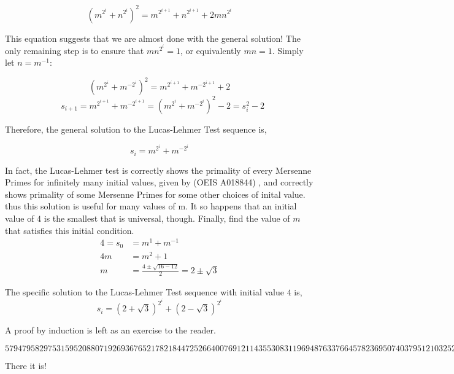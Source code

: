 \documentclass[10pt, oneside]{article}
\begin{document}
    \[\left(m^{2^i} + n^{2^i}\right)^2 = m^{2^{i+1}} + n^{2^{i+1}} + 2mn^{2^i}\]
    
This equation suggests that we are almost done with the general solution! The only remaining step is to ensure that $mn^{2^i} = 1$, or equivalently $mn = 1$. Simply let $n = m^{-1}$:

    \[\left(m^{2^i} + m^{-2^i}\right)^2 = m^{2^{i+1}} + m^{-2^{i+1}} + 2\]
    \[\;\;\, s_{i+1} = m^{2^{i+1}} + m^{-2^{i+1}} = \left(m^{2^i} + m^{-2^i}\right)^2 - 2 = s_i^2 - 2\]
    
Therefore, the general solution to the Lucas-Lehmer Test sequence is,
    
    \[s_i = m^{2^i} + m^{-2^i}\]

In fact, the Lucas-Lehmer test is correctly shows the primality of every Mersenne Primes for infinitely many initial values, given by (OEIS A018844) \cite{OEIS18844}, and correctly shows primality of some Mersenne Primes for some other choices of inital value. thus this solution is useful for many values of m. It so happens that an initial value of $4$ is the smallest that is universal, though. Finally, find the value of $m$ that satisfies this initial condition. 
\begin{align*}
    4 = s_0 &= m^1 + m^{-1}\\
    4m &= m^2 + 1\\
    m &= \frac{4 \pm \sqrt{16-12}}{2} = 2 \pm \sqrt{3}
\end{align*}

The specific solution to the Lucas-Lehmer Test sequence with initial value $4$ is,
    \[s_i = \left(2 + \sqrt{3}\right)^{2^i} + \left(2 - \sqrt{3}\right)^{2^i}\]

A proof by induction is left as an exercise to the reader.


\printbibliography

\medspace

\[\!\!\!\!\!\!\!\!\!\!\!\!\!\!\!\!\!\!\!\!\!\!\!\!\!\!\!\!\!\!\!\!\!\!57947958297531595208807192693676521782184472526640076912114355308311969487633766457823695074037951210325217902591\]

There it is!
\end{document}
